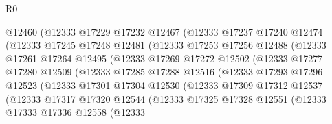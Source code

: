 \begin{lexlean}{R0}
\begin{coremodule}
                        @12460
                        (@12333
                          @17229
                          @17232
                          @12467
                          (@12333
                            @17237
                            @17240
                            @12474
                            (@12333
                              @17245
                              @17248
                              @12481
                              (@12333
                                @17253
                                @17256
                                @12488
                                (@12333
                                  @17261
                                  @17264
                                  @12495
                                  (@12333
                                    @17269
                                    @17272
                                    @12502
                                    (@12333
                                      @17277
                                      @17280
                                      @12509
                                      (@12333
                                        @17285
                                        @17288
                                        @12516
                                        (@12333
                                          @17293
                                          @17296
                                          @12523
                                          (@12333
                                            @17301
                                            @17304
                                            @12530
                                            (@12333
                                              @17309
                                              @17312
                                              @12537
                                              (@12333
                                                @17317
                                                @17320
                                                @12544
                                                (@12333
                                                  @17325
                                                  @17328
                                                  @12551
                                                  (@12333
                                                    @17333
                                                    @17336
                                                    @12558
                                                    (@12333

\end{coremodule}
\end{lexlean}
